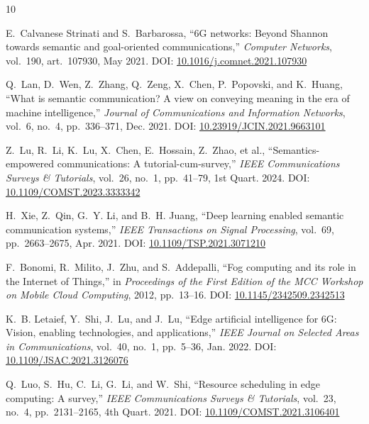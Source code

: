 \documentclass{BVP_CINC}
\begin{document}

\begin{thebibliography}{10}

E.~Calvanese Strinati and S.~Barbarossa, ``6G networks: Beyond Shannon towards semantic and goal-oriented communications,'' \emph{Computer Networks}, vol.~190, art.~107930, May 2021. DOI: \href{https://doi.org/10.1016/j.comnet.2021.107930}{10.1016/j.comnet.2021.107930}

Q.~Lan, D.~Wen, Z.~Zhang, Q.~Zeng, X.~Chen, P.~Popovski, and K.~Huang, ``What is semantic communication? A view on conveying meaning in the era of machine intelligence,'' \emph{Journal of Communications and Information Networks}, vol.~6, no.~4, pp.~336--371, Dec. 2021. DOI: \href{https://doi.org/10.23919/JCIN.2021.9663101}{10.23919/JCIN.2021.9663101}

Z.~Lu, R.~Li, K.~Lu, X.~Chen, E.~Hossain, Z.~Zhao, et al., ``Semantics-empowered communications: A tutorial-cum-survey,'' \emph{IEEE Communications Surveys \& Tutorials}, vol.~26, no.~1, pp.~41--79, 1st Quart. 2024. DOI: \href{https://doi.org/10.1109/COMST.2023.3333342}{10.1109/COMST.2023.3333342}

H.~Xie, Z.~Qin, G.~Y. Li, and B.~H. Juang, ``Deep learning enabled semantic communication systems,'' \emph{IEEE Transactions on Signal Processing}, vol.~69, pp.~2663--2675, Apr. 2021. DOI: \href{https://doi.org/10.1109/TSP.2021.3071210}{10.1109/TSP.2021.3071210}

F.~Bonomi, R.~Milito, J.~Zhu, and S.~Addepalli, ``Fog computing and its role in the Internet of Things,'' in \emph{Proceedings of the First Edition of the MCC Workshop on Mobile Cloud Computing}, 2012, pp.~13--16. DOI: \href{https://doi.org/10.1145/2342509.2342513}{10.1145/2342509.2342513}

K.~B. Letaief, Y.~Shi, J.~Lu, and J.~Lu, ``Edge artificial intelligence for 6G: Vision, enabling technologies, and applications,'' \emph{IEEE Journal on Selected Areas in Communications}, vol.~40, no.~1, pp.~5--36, Jan. 2022. DOI: \href{https://doi.org/10.1109/JSAC.2021.3126076}{10.1109/JSAC.2021.3126076}

Q.~Luo, S.~Hu, C.~Li, G.~Li, and W.~Shi, ``Resource scheduling in edge computing: A survey,'' \emph{IEEE Communications Surveys \& Tutorials}, vol.~23, no.~4, pp.~2131--2165, 4th Quart. 2021. DOI: \href{https://doi.org/10.1109/COMST.2021.3106401}{10.1109/COMST.2021.3106401}


\end{thebibliography}
\end{document}

